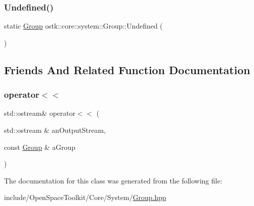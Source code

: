 \mbox{\label{classostk_1_1core_1_1system_1_1_group_aa12c2323a11d4352246757b4d0b97ab3}} 
\subsubsection{\texorpdfstring{Undefined()}{Undefined()}}
{\footnotesize\ttfamily static \hyperlink{classostk_1_1core_1_1system_1_1_group}{Group} ostk\+::core\+::system\+::\+Group\+::\+Undefined (\begin{DoxyParamCaption}{ }\end{DoxyParamCaption})\hspace{0.3cm}{\ttfamily [static]}}



\subsection{Friends And Related Function Documentation}
\mbox{\label{classostk_1_1core_1_1system_1_1_group_adae6b8468d9a0cf648a52c296c6db73a}} 
\subsubsection{\texorpdfstring{operator$<$$<$}{operator<<}}
{\footnotesize\ttfamily std\+::ostream\& operator$<$$<$ (\begin{DoxyParamCaption}\item[{std\+::ostream \&}]{an\+Output\+Stream,  }\item[{const \hyperlink{classostk_1_1core_1_1system_1_1_group}{Group} \&}]{a\+Group }\end{DoxyParamCaption})\hspace{0.3cm}{\ttfamily [friend]}}



The documentation for this class was generated from the following file\+:\begin{DoxyCompactItemize}
\item 
include/\+Open\+Space\+Toolkit/\+Core/\+System/\hyperlink{_group_8hpp}{Group.\+hpp}\end{DoxyCompactItemize}
